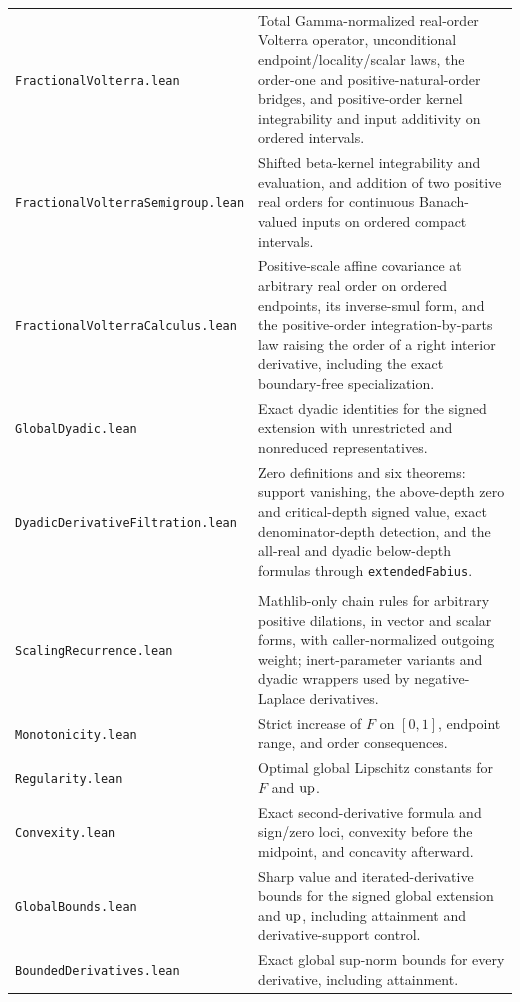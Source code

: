 \documentclass[11pt,oneside]{article}
\theoremstyle{definition}
\theoremstyle{remark}
\begin{document}
\begin{longtable}{>{\raggedright\arraybackslash}p{} >{\raggedright\arraybackslash}p{}}
\nolinkurl{FractionalVolterra.lean} & Total Gamma-normalized real-order Volterra operator, unconditional endpoint/locality/scalar laws, the order-one and positive-natural-order bridges, and positive-order kernel integrability and input additivity on ordered intervals. \\
\nolinkurl{FractionalVolterraSemigroup.lean} & Shifted beta-kernel integrability and evaluation, and addition of two positive real orders for continuous Banach-valued inputs on ordered compact intervals. \\
\nolinkurl{FractionalVolterraCalculus.lean} & Positive-scale affine covariance at arbitrary real order on ordered endpoints, its inverse-smul form, and the positive-order integration-by-parts law raising the order of a right interior derivative, including the exact boundary-free specialization. \\
\nolinkurl{GlobalDyadic.lean} & Exact dyadic identities for the signed extension with unrestricted and nonreduced representatives. \\
\nolinkurl{DyadicDerivativeFiltration.lean} & Zero definitions and six theorems: support vanishing, the above-depth zero and critical-depth signed value, exact denominator-depth detection, and the all-real and dyadic below-depth formulas through \nolinkurl{extendedFabius}. \\
\addlinespace[0.45em]
\multicolumn{2}{l}{\textbf{Global shape, inversion, and computability}}\\[0.25em]
\nolinkurl{ScalingRecurrence.lean} & Mathlib-only chain rules for arbitrary positive dilations, in vector and scalar forms, with caller-normalized outgoing weight; inert-parameter variants and dyadic wrappers used by negative-Laplace derivatives. \\
\nolinkurl{Monotonicity.lean} & Strict increase of \(F\) on \([0,1]\), endpoint range, and order consequences. \\
\nolinkurl{Regularity.lean} & Optimal global Lipschitz constants for \(F\) and \(\operatorname{up}\). \\
\nolinkurl{Convexity.lean} & Exact second-derivative formula and sign/zero loci, convexity before the midpoint, and concavity afterward. \\
\nolinkurl{GlobalBounds.lean} & Sharp value and iterated-derivative bounds for the signed global extension and \(\operatorname{up}\), including attainment and derivative-support control. \\
\nolinkurl{BoundedDerivatives.lean} & Exact global sup-norm bounds for every derivative, including attainment. \\

\end{longtable}
\end{document}
